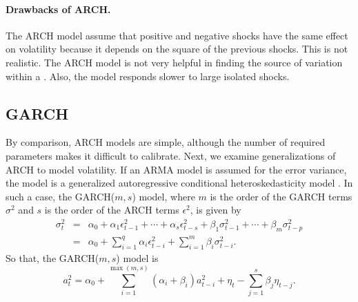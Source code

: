 \paragraph{Drawbacks of ARCH.} The ARCH model assume that positive and negative shocks have the same effect on volatility because it depends on the square of the previous shocks. This is not realistic. The ARCH model is not very helpful in finding the source of variation within a \fts{}. Also, the model responds slower to large isolated shocks.

\subsection{GARCH}\label{garch}
By comparison, ARCH models are simple, although the number of required parameters makes it difficult to calibrate. Next, we examine generalizations of ARCH to model volatility.
If an ARMA model is assumed for the error variance, the model is a generalized autoregressive conditional heteroskedasticity model \cite{bollerslev1986garch}. In such a case, the GARCH($m, s$) model, where $m$ is the order of the GARCH terms $\sigma^2$ and $s$ is the order of the ARCH terms $\epsilon^2$, is given by
\begin{eqnarray*}
\sigma_t^2&=&\alpha_0 + \alpha_1 \epsilon_{t-1}^2 + \cdots + \alpha_s \epsilon_{t-s}^2 + \beta_1 \sigma_{t-1}^2 + \cdots + \beta_m\sigma_{t-p}^2 \\
&=& \alpha_0 + \sum_{i=1}^q \alpha_i \epsilon_{t-i}^2 + \sum_{i=1}^m \beta_i \sigma_{t-i}^2.
\end{eqnarray*}
So that, the GARCH($m,s$) model is
\begin{equation}
a^2_t = \alpha_0 + \sum^{\max(m,s)}_{i=1} (\alpha_i + \beta_i) a^2_{t-i}+\eta_t
- \sum^s_{j=1} \beta_j \eta_{t-j}.
\label{eq:garch}
\end{equation}

